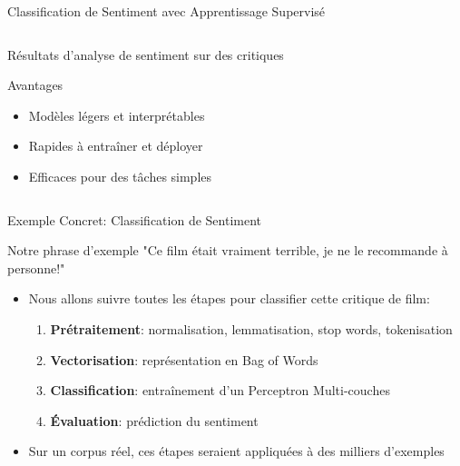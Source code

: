 \documentclass[aspectratio=169,11pt]{beamer}
\begin{document}
\begin{frame}{Classification de Sentiment avec Apprentissage Supervisé}
\begin{columns}
\begin{column}{0.45\textwidth}
            \begin{center}
                \small{Résultats d'analyse de sentiment sur des critiques}
            \end{center}
            \vspace{0.1cm}
            \begin{alertblock}{Avantages}
                \begin{itemize}
                    \item Modèles légers et interprétables
                    \item Rapides à entraîner et déployer
                    \item Efficaces pour des tâches simples
                \end{itemize}
            \end{alertblock}
        \end{column}
    \end{columns}
\end{frame}

\begin{frame}{Exemple Concret: Classification de Sentiment}
    \begin{exampleblock}{Notre phrase d'exemple}
        \centering
        \large
        "Ce film était vraiment terrible, je ne le recommande à personne!"
    \end{exampleblock}
    
    \vspace{0.3cm}
    \begin{itemize}
        \item Nous allons suivre toutes les étapes pour classifier cette critique de film:
        \begin{enumerate}
            \item \textbf{Prétraitement}: normalisation, lemmatisation, stop words, tokenisation
            \item \textbf{Vectorisation}: représentation en Bag of Words
            \item \textbf{Classification}: entraînement d'un Perceptron Multi-couches
            \item \textbf{Évaluation}: prédiction du sentiment
        \end{enumerate}
        \item Sur un corpus réel, ces étapes seraient appliquées à des milliers d'exemples
    \end{itemize}
\end{frame}
\end{document}
